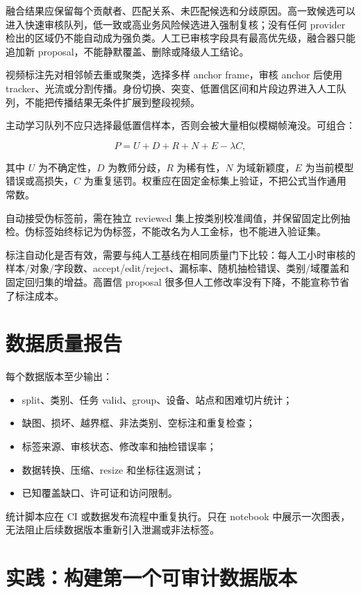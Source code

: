 融合结果应保留每个贡献者、匹配关系、未匹配候选和分歧原因。高一致候选可以进入快速审核队列，低一致或高业务风险候选进入强制复核；没有任何 provider 检出的区域仍不能自动成为强负类。人工已审核字段具有最高优先级，融合器只能追加新 proposal，不能静默覆盖、删除或降级人工结论。

视频标注先对相邻帧去重或聚类，选择多样 anchor frame，审核 anchor 后使用 tracker、光流或分割传播。身份切换、突变、低置信区间和片段边界进入人工队列，不能把传播结果无条件扩展到整段视频。

主动学习队列不应只选择最低置信样本，否则会被大量相似模糊帧淹没。可组合：

\begin{equation}
  P=U+D+R+N+E-\lambda C,
\end{equation}

其中 $U$ 为不确定性，$D$ 为教师分歧，$R$ 为稀有性，$N$ 为域新颖度，$E$ 为当前模型错误或高损失，$C$ 为重复惩罚。权重应在固定金标集上验证，不把公式当作通用常数。

自动接受伪标签前，需在独立 reviewed 集上按类别校准阈值，并保留固定比例抽检。伪标签始终标记为伪标签，不能改名为人工金标，也不能进入验证集。

标注自动化是否有效，需要与纯人工基线在相同质量门下比较：每人工小时审核的样本/对象/字段数、accept/edit/reject、漏标率、随机抽检错误、类别/域覆盖和固定回归集的增益。高置信 proposal 很多但人工修改率没有下降，不能宣称节省了标注成本。

\section{数据质量报告}

每个数据版本至少输出：

\begin{itemize}
  \item split、类别、任务 valid、group、设备、站点和困难切片统计；
  \item 缺图、损坏、越界框、非法类别、空标注和重复检查；
  \item 标签来源、审核状态、修改率和抽检错误率；
  \item 数据转换、压缩、resize 和坐标往返测试；
  \item 已知覆盖缺口、许可证和访问限制。
\end{itemize}

统计脚本应在 CI 或数据发布流程中重复执行。只在 notebook 中展示一次图表，无法阻止后续数据版本重新引入泄漏或非法标签。

\section{实践：构建第一个可审计数据版本}

